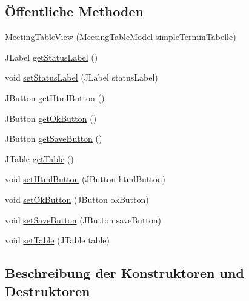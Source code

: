 \subsection*{Öffentliche Methoden}
\begin{DoxyCompactItemize}
\item 
\hyperlink{classde_1_1turnierverwaltung_1_1view_1_1_meeting_table_view_ad65b02da1fc0f5b53524074cd7b6a41a}{Meeting\+Table\+View} (\hyperlink{classde_1_1turnierverwaltung_1_1model_1_1_meeting_table_model}{Meeting\+Table\+Model} simple\+Termin\+Tabelle)
\item 
J\+Label \hyperlink{classde_1_1turnierverwaltung_1_1view_1_1_meeting_table_view_aa1df6a971895c147bb08c9e25d4edb85}{get\+Status\+Label} ()
\item 
void \hyperlink{classde_1_1turnierverwaltung_1_1view_1_1_meeting_table_view_a4362f4b091af299bee6b5c926c820f2e}{set\+Status\+Label} (J\+Label status\+Label)
\item 
J\+Button \hyperlink{classde_1_1turnierverwaltung_1_1view_1_1_meeting_table_view_a87d31f404c42030c2b1ffcb7a3033908}{get\+Html\+Button} ()
\item 
J\+Button \hyperlink{classde_1_1turnierverwaltung_1_1view_1_1_meeting_table_view_a6135dbe89355eb57584f1c053dfca965}{get\+Ok\+Button} ()
\item 
J\+Button \hyperlink{classde_1_1turnierverwaltung_1_1view_1_1_meeting_table_view_a880b98ea3d3e1a5b42df4a8ad6396795}{get\+Save\+Button} ()
\item 
J\+Table \hyperlink{classde_1_1turnierverwaltung_1_1view_1_1_meeting_table_view_a659cfc61c296dbf0ddb486c42045c2ed}{get\+Table} ()
\item 
void \hyperlink{classde_1_1turnierverwaltung_1_1view_1_1_meeting_table_view_a64ce8d0ee0820a3d1523e53a989d93e1}{set\+Html\+Button} (J\+Button html\+Button)
\item 
void \hyperlink{classde_1_1turnierverwaltung_1_1view_1_1_meeting_table_view_a9e84b6bcfa225cd0bfbec8e74590071d}{set\+Ok\+Button} (J\+Button ok\+Button)
\item 
void \hyperlink{classde_1_1turnierverwaltung_1_1view_1_1_meeting_table_view_a1ad06579895999b626917cec08a8bebb}{set\+Save\+Button} (J\+Button save\+Button)
\item 
void \hyperlink{classde_1_1turnierverwaltung_1_1view_1_1_meeting_table_view_a5d0f4065508a75531af73d07f04a361c}{set\+Table} (J\+Table table)
\end{DoxyCompactItemize}


\subsection{Beschreibung der Konstruktoren und Destruktoren}
